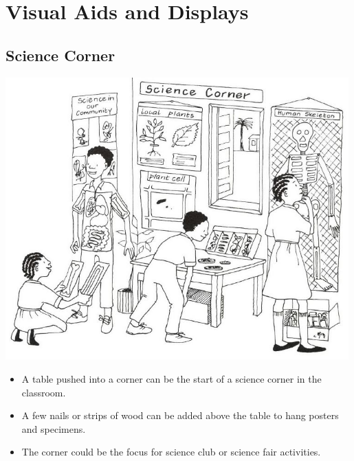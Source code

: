 \chapter{Visual Aids and Displays}
\label{cha:displays}


\section{Science Corner}

\begin{center}
\includegraphics[width=0.99\textwidth]{./img/vso/science-corner.jpg}
\end{center}

\begin{itemize}
\item A table pushed into a corner can be the start of a science corner in
the classroom.
\item A few nails or strips of wood can be added above the table to hang
posters and specimens.
\item The corner could be the focus for science club or science fair activities.
\end{itemize}

\vfill
\pagebreak


